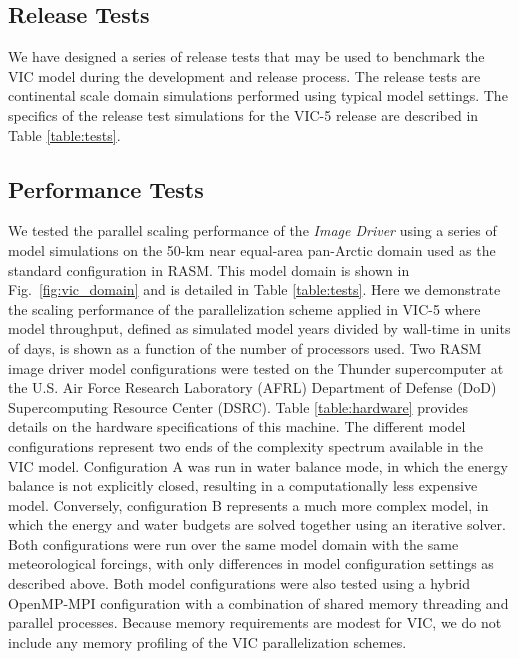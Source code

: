 \documentclass[gmd, manuscript]{copernicus}
\begin{document}
    \subsection{Release Tests}

    We have designed a series of release tests that may be used to benchmark the VIC model during the development and release process. The release tests are continental scale domain simulations performed using typical model settings. The specifics of the release test simulations for the VIC-5 release are described in Table \ref{table:tests}.

    \subsection{Performance Tests}

    We tested the parallel scaling performance of the \textit{Image Driver} using a series of model simulations on the 50-km near equal-area pan-Arctic domain used as the standard configuration in RASM. This model domain is shown in Fig.~\ref{fig:vic_domain} and is detailed in Table \ref{table:tests}. Here we demonstrate the scaling performance of the parallelization scheme applied in VIC-5 where model throughput, defined as simulated model years divided by wall-time in units of days, is shown as a function of the number of processors used. Two RASM image driver model configurations were tested on the Thunder supercomputer at the U.S. Air Force Research Laboratory (AFRL) Department of Defense (DoD) Supercomputing Resource Center (DSRC). Table \ref{table:hardware} provides details on the hardware specifications of this machine. The different model configurations represent two ends of the complexity spectrum available in the VIC model. Configuration A was run in water balance mode, in which the energy balance is not explicitly closed, resulting in a computationally less expensive model. Conversely, configuration B represents a much more complex model, in which the energy and water budgets are solved together using an iterative solver. Both configurations were run over the same model domain with the same meteorological forcings, with only differences in model configuration settings as described above. Both model configurations were also tested using a hybrid OpenMP-MPI configuration with a combination of shared memory threading and parallel processes. Because memory requirements are modest for VIC, we do not include any memory profiling of the VIC parallelization schemes.
\end{document}
